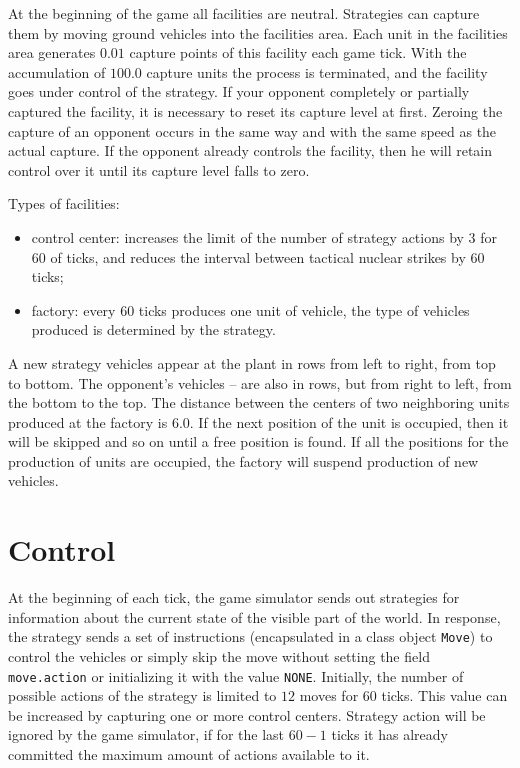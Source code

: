 At the beginning of the game all facilities are neutral. Strategies can capture them by moving ground vehicles into the facilities area.
Each unit in the facilities area generates $0.01$ capture points of this facility each game tick. With the accumulation of $100.0$ capture units
the process is terminated, and the facility goes under control of the strategy. If your opponent completely or partially captured the facility,
it is necessary to reset its capture level at first. Zeroing the capture of an opponent occurs in the same way and with the same speed as the actual
capture. If the opponent already controls the facility, then he will retain control over it until its capture level falls
to zero.

Types of facilities:
\begin{itemize}
    \item control center: increases the limit of the number of strategy actions by $3$ for $60$ of ticks, and
        reduces the interval between tactical nuclear strikes by $60$ ticks;
    \item factory: every $60$ ticks produces one unit of vehicle, the type of vehicles produced is determined by the strategy.
\end{itemize}

A new strategy vehicles appear at the plant in rows from left to right, from top to bottom. The opponent’s vehicles – are also in rows, but from right to left, from the bottom to the top. The distance between the centers of two neighboring units produced at the factory is $6.0$. If the next position of the unit is occupied,
then it will be skipped and so on until a free position is found. If all the positions for the production of units are occupied, the factory
will suspend production of new vehicles.

\section{Control}

At the beginning of each tick, the game simulator sends out strategies for information about the current state of the visible part of the world. In response, the strategy sends a set of instructions (encapsulated in a class object \texttt{Move}) to control the vehicles or simply skip the move without setting the field
\texttt{move.action} or initializing it with the value \texttt{NONE}. Initially, the number of possible actions of the strategy is limited to $12$
moves for $60$ ticks. This value can be increased by capturing one or more control centers. Strategy action
will be ignored by the game simulator, if for the last $60 - 1$ ticks it has already committed the maximum amount of actions available to it.

